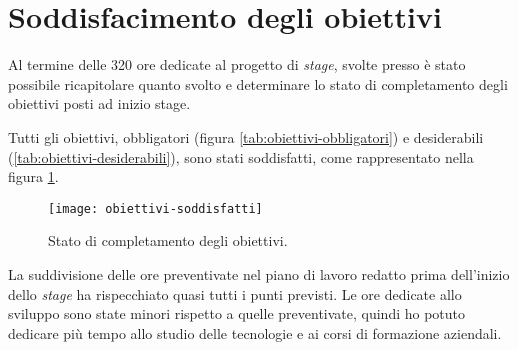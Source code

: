 \section{Soddisfacimento degli obiettivi}
Al termine delle 320 ore dedicate al progetto di \textit{stage}, svolte presso \azienda{} è stato possibile 
ricapitolare quanto svolto e determinare lo stato di completamento degli obiettivi posti
ad inizio stage.

\noindent Tutti gli obiettivi, obbligatori (figura \ref{tab:obiettivi-obbligatori}) e desiderabili (\ref{tab:obiettivi-desiderabili}), sono stati soddisfatti, 
come rappresentato nella figura \ref{fig:obiettivi-soddisfatti}.

\begin{figure}[!h] 
  \centering 
  \texttt{[image: obiettivi-soddisfatti]} 
  \caption{Stato di completamento degli obiettivi.}
  \label{fig:obiettivi-soddisfatti}
\end{figure}

La suddivisione delle ore preventivate nel piano di lavoro redatto prima dell’inizio
dello \textit{stage} ha rispecchiato quasi tutti i punti previsti. 
Le ore dedicate allo sviluppo sono state minori rispetto a quelle preventivate,
quindi ho potuto dedicare più tempo allo studio delle tecnologie e ai 
corsi di formazione aziendali.\\